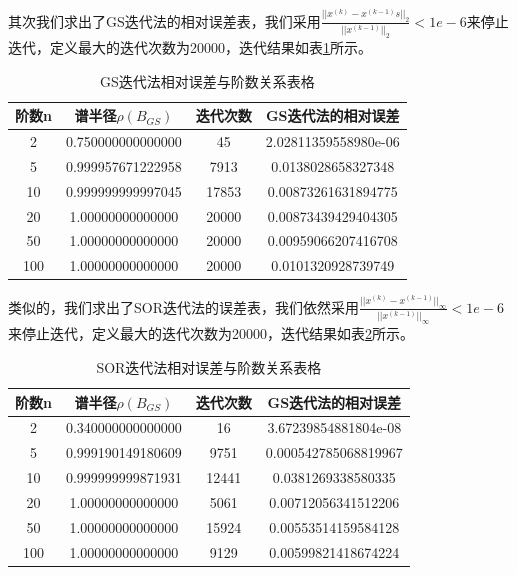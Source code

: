 \documentclass[a4paper]{article}
\begin{document}
其次我们求出了GS迭代法的相对误差表，我们采用$\frac{||x^{(k)}-x^{(k-1)}s||_2}{||x^{(k-1)}||_2}<1e-6$来停止迭代，定义最大的迭代次数为20000，迭代结果如表\ref{tab:table4}所示。
	
	\begin{table}[htbp]
		\centering
		\caption{GS迭代法相对误差与阶数关系表格}
		\label{tab:table4}
		\begin{tabular}{|c|c|c|c|}
			\hline
			阶数n & 谱半径$\rho(B_{GS})$& 迭代次数 &GS迭代法的相对误差 \\
			\hline
			2 &0.750000000000000 &45 & 2.02811359558980e-06\\
			\hline
			5 &0.999957671222958 &7913 & 0.0138028658327348\\
			\hline
			10 &0.999999999997045 &17853 & 0.00873261631894775\\
			\hline
			20 &1.00000000000000 &20000 & 0.00873439429404305\\
			\hline
			50 &1.00000000000000 &20000 & 0.00959066207416708\\
			\hline
			100 &1.00000000000000 &20000 & 0.0101320928739749\\
			\hline
		\end{tabular}
	\end{table}

类似的，我们求出了SOR迭代法的误差表，我们依然采用$\frac{||x^{(k)}-x^{(k-1)}||_\infty}{||x^{(k-1)}||_\infty}<1e-6$来停止迭代，定义最大的迭代次数为20000，迭代结果如表\ref{tab:table5}所示。

\begin{table}[htbp]
	\centering
	\caption{SOR迭代法相对误差与阶数关系表格}
	\label{tab:table5}
	\begin{tabular}{|c|c|c|c|}
		\hline
		阶数n & 谱半径$\rho(B_{GS})$& 迭代次数 &GS迭代法的相对误差 \\
		\hline
		2 &0.340000000000000 &16 & 3.67239854881804e-08\\
		\hline
		5 &0.999190149180609 &9751 & 0.000542785068819967\\
		\hline
		10 &0.999999999871931 &12441 & 0.0381269338580335\\
		\hline
		20 &1.00000000000000 &5061 & 0.00712056341512206\\
		\hline
		50 &1.00000000000000 &15924 & 0.00553514159584128\\
		\hline
		100 &1.00000000000000 &9129 & 0.00599821418674224\\
		\hline
	\end{tabular}
\end{table}
\end{document}
